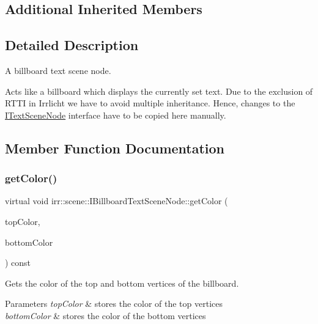 \subsection*{Additional Inherited Members}


\subsection{Detailed Description}
A billboard text scene node. 

Acts like a billboard which displays the currently set text. Due to the exclusion of R\+T\+TI in Irrlicht we have to avoid multiple inheritance. Hence, changes to the \hyperlink{classirr_1_1scene_1_1ITextSceneNode}{I\+Text\+Scene\+Node} interface have to be copied here manually. 

\subsection{Member Function Documentation}
\mbox{\label{classirr_1_1scene_1_1IBillboardTextSceneNode_ac142a04e455811d5a3efa47ce2499d18}} 
\subsubsection{\texorpdfstring{get\+Color()}{getColor()}}
{\footnotesize\ttfamily virtual void irr\+::scene\+::\+I\+Billboard\+Text\+Scene\+Node\+::get\+Color (\begin{DoxyParamCaption}\item[{\hyperlink{classirr_1_1video_1_1SColor}{video\+::\+S\+Color} \&}]{top\+Color,  }\item[{\hyperlink{classirr_1_1video_1_1SColor}{video\+::\+S\+Color} \&}]{bottom\+Color }\end{DoxyParamCaption}) const\hspace{0.3cm}{\ttfamily [pure virtual]}}



Gets the color of the top and bottom vertices of the billboard. 


\begin{DoxyParams}{Parameters}
{\em top\+Color} & stores the color of the top vertices \\
\hline
{\em bottom\+Color} & stores the color of the bottom vertices \\
\hline
\end{DoxyParams}


